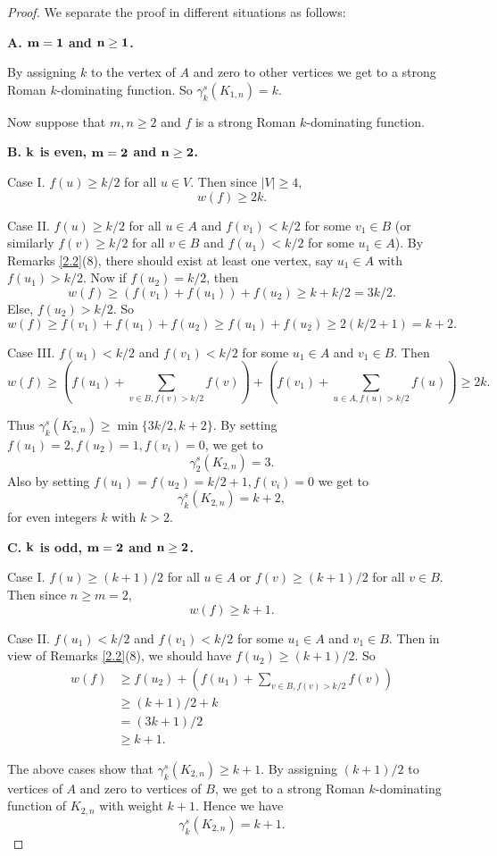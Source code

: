 \documentclass[12pt]{amsart}
\begin{document}
\begin{proof}
We separate the proof in different situations as follows:

\textbf{A.  ${\bf m=1}$ and ${\bf n\geq 1}$.} 

By assigning $k$ to the vertex of $A$ and zero to other vertices we get to a strong Roman $k$-dominating function. So $\gamma_k^s (K_{1,n})=k$.  

Now suppose that  $m,n\geq 2$ and $f$ is a strong Roman $k$-dominating function. 


\textbf{B.  ${\bf k}$ is even, ${\bf m=2}$ and ${\bf n\geq 2}$.}

Case I. $f(u)\geq k/2$ for all $u\in V$. Then since $|V|\geq 4$, 
$$w(f)\geq 2k.$$

Case II. $f(u)\geq k/2$ for all $u\in A$ and $f(v_1)<k/2$ for some $v_1\in B$ (or similarly $f(v)\geq k/2$ for all $v\in B$ and $f(u_1)<k/2$ for some $u_1\in A$).
By Remarks \ref{2.2}(8),  there should exist at least one vertex, say $u_1\in A$ with $f(u_1)>k/2$. Now if $f(u_2)=k/2$, then 
$$w(f)\geq (f(v_1)+f(u_1))+f(u_2)\geq k+k/2=3k/2.$$
Else, $f(u_2)>k/2$. So
$$w(f)\geq f(v_1)+f(u_1)+f(u_2)\geq f(u_1)+f(u_2)\geq 2(k/2+1)=k+2.$$

Case III. $f(u_1)<k/2$ and $f(v_1)<k/2$ for some $u_1\in A$ and $v_1\in B$. Then 
$$w(f)\geq (f(u_1)+\sum_{v\in B, f(v)>k/2}f(v)) + (f(v_1)+\sum_{u\in A, f(u)>k/2}f(u))\geq 2k.$$

Thus $\gamma_k^s(K_{2,n})\geq \min\{3k/2, k+2\}$. By setting $f(u_1)=2, f(u_2)=1, f(v_i)=0$, we get to 
$$\gamma_2^s(K_{2,n})=3.$$
 Also by setting $f(u_1)=f(u_2)=k/2+1, f(v_i)=0$ we get to 
$$\gamma_k^s(K_{2,n})=k+2,$$
 for even integers $k$ with $k>2$.


\textbf{C. ${\bf k}$ is odd, ${\bf m=2}$ and ${\bf n\geq 2}$.} 

Case I. $f(u)\geq (k+1)/2$ for all $u\in A$ or $f(v)\geq (k+1)/2$ for all $v\in B$. Then since $n\geq m=2$,
$$w(f)\geq k+1.$$

Case II.  $f(u_1)<k/2$ and $f(v_1)<k/2$ for some $u_1\in A$ and $v_1\in B$. Then in view of Remarks \ref{2.2}(8), we should have $f(u_2)\geq (k+1)/2$. So
\begin{align*}
w(f)&\geq f(u_2)+(f(u_1)+\sum _{v\in B, f(v)>k/2} f(v))\\
&\geq (k+1)/2+k\\
&=(3k+1)/2\\
&\geq k+1.
\end{align*}

The above cases show that $\gamma_k^s(K_{2,n})\geq k+1$. By assigning $(k+1)/2$ to vertices of $A$ and zero to vertices of $B$, we get to a strong Roman $k$-dominating function of $K_{2,n}$ with weight $k+1$. Hence we have
$$\gamma_k^s(K_{2,n})=k+1.$$


\end{proof}
\end{document}
